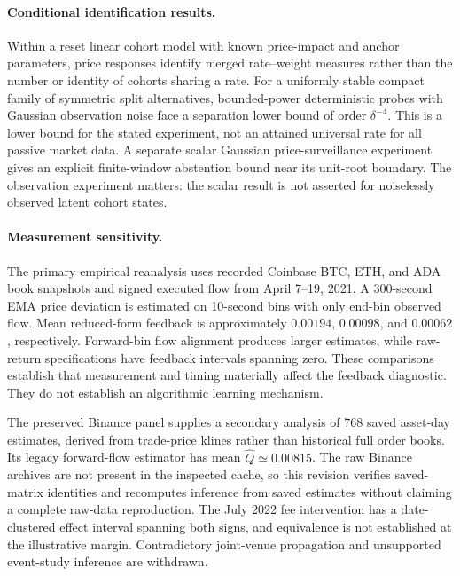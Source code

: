 \documentclass[12pt]{article}
\theoremstyle{definition}
\theoremstyle{remark}
\begin{document}
\paragraph{Conditional identification results.}
Within a reset linear cohort model with known price-impact and anchor parameters, price responses identify merged rate--weight measures rather than the number or identity of cohorts sharing a rate. For a uniformly stable compact family of symmetric split alternatives, bounded-power deterministic probes with Gaussian observation noise face a separation lower bound of order $\delta^{-4}$. This is a lower bound for the stated experiment, not an attained universal rate for all passive market data. A separate scalar Gaussian price-surveillance experiment gives an explicit finite-window abstention bound near its unit-root boundary. The observation experiment matters: the scalar result is not asserted for noiselessly observed latent cohort states.

\paragraph{Measurement sensitivity.}
The primary empirical reanalysis uses recorded Coinbase BTC, ETH, and ADA book snapshots and signed executed flow from April 7--19, 2021. A 300-second EMA price deviation is estimated on 10-second bins with only end-bin observed flow. Mean reduced-form feedback is approximately $0.00194$, $0.00098$, and $0.00062$, respectively. Forward-bin flow alignment produces larger estimates, while raw-return specifications have feedback intervals spanning zero. These comparisons establish that measurement and timing materially affect the feedback diagnostic. They do not establish an algorithmic learning mechanism.

The preserved Binance panel supplies a secondary analysis of 768 saved asset-day estimates, derived from trade-price klines rather than historical full order books. Its legacy forward-flow estimator has mean $\hat Q\simeq0.00815$. The raw Binance archives are not present in the inspected cache, so this revision verifies saved-matrix identities and recomputes inference from saved estimates without claiming a complete raw-data reproduction. The July 2022 fee intervention has a date-clustered effect interval spanning both signs, and equivalence is not established at the illustrative margin. Contradictory joint-venue propagation and unsupported event-study inference are withdrawn.
\end{document}
